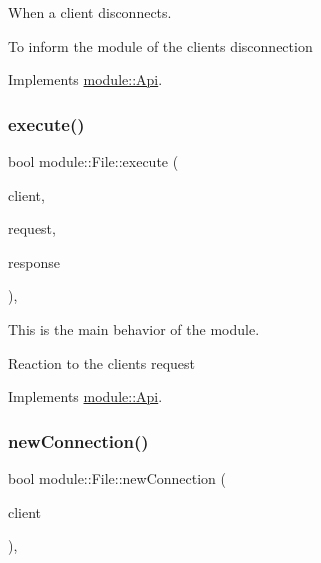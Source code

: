 When a client disconnects. 

To inform the module of the client\textquotesingle{}s disconnection 

Implements \hyperlink{structmodule_1_1Api_a8aa98bd4094fb13916e100509a948763}{module\+::\+Api}.

\mbox{\label{classmodule_1_1File_a7fceec434dd7b735e08b01a5bd16625b}} 
\subsubsection{\texorpdfstring{execute()}{execute()}}
{\footnotesize\ttfamily bool module\+::\+File\+::execute (\begin{DoxyParamCaption}\item[{const \hyperlink{structnet_1_1IClient}{net\+::\+I\+Client} \&}]{client,  }\item[{\hyperlink{structhttp_1_1IRequest}{http\+::\+I\+Request} \&}]{request,  }\item[{\hyperlink{structhttp_1_1IResponse}{http\+::\+I\+Response} \&}]{response }\end{DoxyParamCaption})\hspace{0.3cm}{\ttfamily [virtual]}, {\ttfamily [noexcept]}}



This is the main behavior of the module. 

Reaction to the client\textquotesingle{}s request 

Implements \hyperlink{structmodule_1_1Api_afd1f5243a90811d06d96f725490bcba6}{module\+::\+Api}.

\mbox{\label{classmodule_1_1File_a369f5f98cfbc477e345b7372319737d7}} 
\subsubsection{\texorpdfstring{new\+Connection()}{newConnection()}}
{\footnotesize\ttfamily bool module\+::\+File\+::new\+Connection (\begin{DoxyParamCaption}\item[{const \hyperlink{structnet_1_1IClient}{net\+::\+I\+Client} \&}]{client }\end{DoxyParamCaption})\hspace{0.3cm}{\ttfamily [virtual]}, {\ttfamily [noexcept]}}



